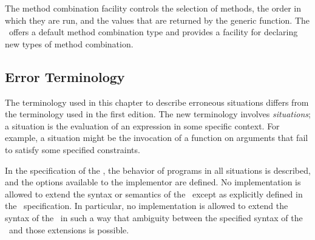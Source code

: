 The method combination facility controls the selection of methods, the
order in which they are run, and the values that are returned by the
generic function.  The \CLOS\ offers a default method combination type
and provides a facility for declaring new types of method combination.


\subsection{Error Terminology}
\label{Error-Terminology-SECTION}

The terminology used in this chapter to describe erroneous
situations differs from the terminology used in the first edition.
The new terminology involves \emph{situations};
a situation is the evaluation of an expression in some
specific context. For example, a situation might be the invocation of
a function on arguments that fail to satisfy some specified
constraints.

In the specification of the \CLOS, the behavior of programs in all situations
is described, and the options available to the implementor are defined. No
implementation is allowed to extend the syntax or semantics of the \OS\ except
as explicitly defined in the \OS\ specification. In particular, no
implementation is allowed to extend the syntax of the \OS\ in such a way that
ambiguity between the specified syntax of the \OS\ and those extensions is
possible.

